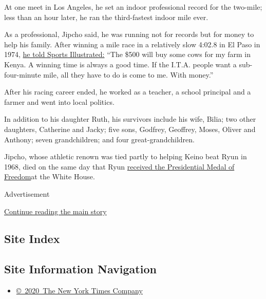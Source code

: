 At one meet in Los Angeles, he set an indoor professional record for the
two-mile; less than an hour later, he ran the third-fastest indoor mile
ever.

As a professional, Jipcho said, he was running not for records but for
money to help his family. After winning a mile race in a relatively slow
4:02.8 in El Paso in 1974,
\href{https://vault.si.com/vault/1974/05/06/the-pros-are-beginning-to-look-professional}{he
told Sports Illustrated:} ``The \$500 will buy some cows for my farm in
Kenya. A winning time is always a good time. If the I.T.A. people want a
sub-four-minute mile, all they have to do is come to me. With money.''

After his racing career ended, he worked as a teacher, a school
principal and a farmer and went into local politics.

In addition to his daughter Ruth, his survivors include his wife, Bilia;
two other daughters, Catherine and Jacky; five sons, Godfrey, Geoffrey,
Moses, Oliver and Anthony; seven grandchildren; and four
great-grandchildren.

Jipcho, whose athletic renown was tied partly to helping Keino beat Ryun
in 1968, died on the same day that Ryun
\href{https://kuathletics.com/jim-ryun-receives-presidential-medal-of-freedom/}{received
the Presidential Medal of Freedom}at the White House.

Advertisement

\protect\hyperlink{after-bottom}{Continue reading the main story}

\hypertarget{site-index}{%
\subsection{Site Index}\label{site-index}}

\hypertarget{site-information-navigation}{%
\subsection{Site Information
Navigation}\label{site-information-navigation}}

\begin{itemize}
\tightlist
\item
  \href{https://help.nytimes.com/hc/en-us/articles/115014792127-Copyright-notice}{©~2020~The
  New York Times Company}
\end{itemize}

